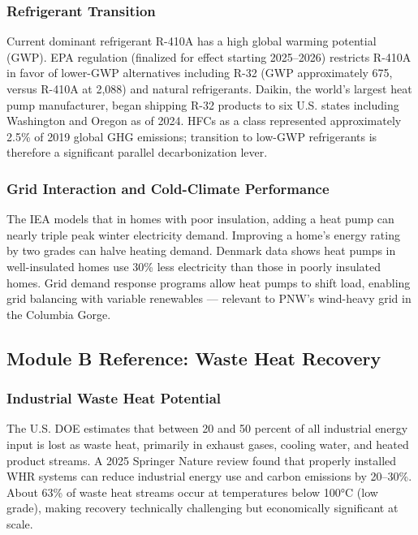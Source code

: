 \documentclass[11pt,letterpaper]{article}
\begin{document}
\subsubsection{Refrigerant Transition}
Current dominant refrigerant R-410A has a high global warming potential (GWP). EPA regulation (finalized for effect starting 2025--2026) restricts R-410A in favor of lower-GWP alternatives including R-32 (GWP approximately 675, versus R-410A at 2,088) and natural refrigerants. Daikin, the world's largest heat pump manufacturer, began shipping R-32 products to six U.S. states including Washington and Oregon as of 2024. HFCs as a class represented approximately 2.5\% of 2019 global GHG emissions; transition to low-GWP refrigerants is therefore a significant parallel decarbonization lever.

\subsubsection{Grid Interaction and Cold-Climate Performance}
The IEA models that in homes with poor insulation, adding a heat pump can nearly triple peak winter electricity demand. Improving a home's energy rating by two grades can halve heating demand. Denmark data shows heat pumps in well-insulated homes use 30\% less electricity than those in poorly insulated homes. Grid demand response programs allow heat pumps to shift load, enabling grid balancing with variable renewables — relevant to PNW's wind-heavy grid in the Columbia Gorge.

\subsection{Module B Reference: Waste Heat Recovery}

\subsubsection{Industrial Waste Heat Potential}
The U.S. DOE estimates that between 20 and 50 percent of all industrial energy input is lost as waste heat, primarily in exhaust gases, cooling water, and heated product streams. A 2025 Springer Nature review found that properly installed WHR systems can reduce industrial energy use and carbon emissions by 20--30\%. About 63\% of waste heat streams occur at temperatures below 100°C (low grade), making recovery technically challenging but economically significant at scale.
\end{document}
